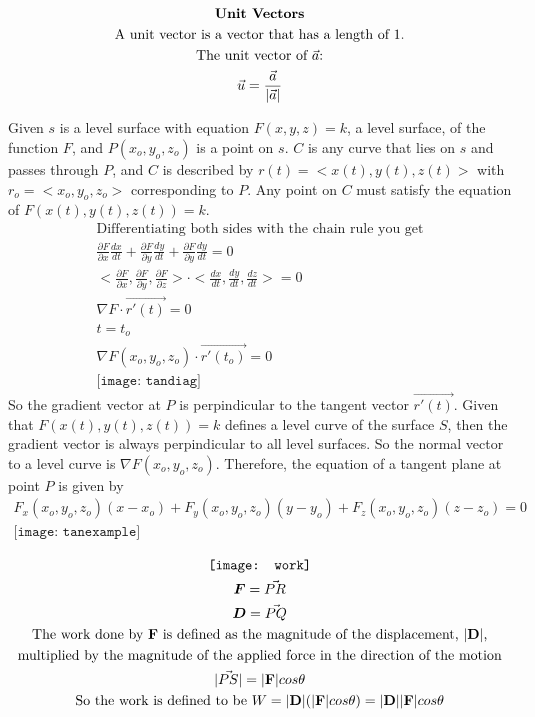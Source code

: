 \documentclass{article}
\begin{document}
\begin{gather*}
\text{\textbf{Unit Vectors}}
\\
   \text{A unit vector is a vector that has a length of 1.}
   \\
   \text{The unit vector of } \Vec{a} \text{:}
   \\
   \Vec{u}= \frac{\Vec{a}}{|\Vec{a}|}
\end{gather*}

Given $s$ is a level surface with equation $F(x,y,z) = k$, a level surface, of the function $F$, and $P(x_o,y_o,z_o)$ is a point on $s$. $C$ is any curve that lies on $s$ and passes through $P$, and $C$ is described by $r(t) = <x(t), y(t), z(t)>$ with $r_o = <x_o, y_o, z_o>$ corresponding to $P$. Any point on $C$ must satisfy the equation of $F(x(t), y(t), z(t)) = k$.
\begin{gather*}
   \text{Differentiating both sides with the chain rule you get}
   \\
   \frac{\partial{F}}{\partial{x}}\frac{dx}{dt} + \frac{\partial{F}}{\partial{y}}\frac{dy}{dt} + \frac{\partial{F}}{\partial{y}}\frac{dy}{dt} = 0
   \\
   <\frac{\partial{F}}{\partial{x}}, \frac{\partial{F}}{\partial{y}}, \frac{\partial{F}}{\partial{z}}>\cdot<\frac{dx}{dt}, \frac{dy}{dt}, \frac{dz}{dt}> = 0
   \\
   \nabla F\cdot\vec{r'(t)} = 0
   \\
   t = t_o
   \\
   \nabla F(x_o, y_o, z_o)\cdot\vec{r'(t_o)} = 0
   \\
   \texttt{[image: tandiag]}
\end{gather*}
   So the gradient vector at $P$ is perpindicular to the tangent vector $\vec{r'(t)}$. Given that $F(x(t), y(t), z(t)) = k$ defines a level curve of the surface $S$, then the gradient vector is always perpindicular to all level surfaces. So the normal vector to a level curve is $\nabla F(x_o, y_o, z_o)$. Therefore, the equation of a tangent plane at point $P$ is given by
\begin{gather*}
   F_x(x_o, y_o, z_o)(x-x_o) + F_y(x_o, y_o, z_o)(y-y_o) + F_z(x_o, y_o, z_o)(z-z_o) = 0 
   \\
   \texttt{[image: tanexample]}
\end{gather*}

\begin{gather*}
   \texttt{[image: work]}
   \\
   \boldsymbol{F} = \vec{PR}
   \\
   \boldsymbol{D} = \vec{PQ}
   \\
   \text{The work done by $\bf{F}$ is defined as the magnitude of the displacement, $|\bf{D}|$,}
   \\
   \text{multiplied by the magnitude of the applied force in the direction of the motion}
   \\
   |\vec{PS}| = |\textbf{F} |cos\theta
   \\
   \text{So the work is defined to be }
   W = |\textbf{D}|(|\textbf{F} |cos\theta) = |\textbf{D}||\textbf{F}| cos\theta
\end{gather*}
\end{document}
